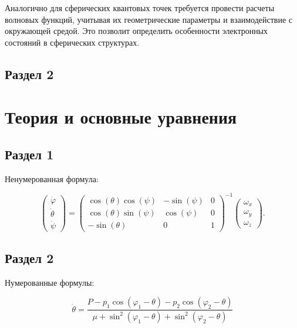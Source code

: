 \documentclass[a4paper,14pt]{extarticle}
\begin{document}
Аналогично для сферических квантовых точек требуется провести расчеты волновых функций, учитывая их геометрические параметры и взаимодействие с окружающей средой. Это позволит определить особенности электронных состояний в сферических структурах.

\subsection{Раздел 2}

\pagebreak
\section{Теория и основные уравнения}

\subsection{Раздел 1}

Ненумерованная формула:

\begin{equation}
    \begin{pmatrix} \dot{\varphi}\\ \dot{\theta} \\ \dot{\psi} \end{pmatrix}
    = \begin{pmatrix}
        \cos(\theta)\cos(\psi) & -\sin(\psi) & 0 \\
        \cos(\theta)\sin(\psi) & \cos(\psi)  & 0 \\
        -\sin(\theta)         & 0         &  1
    \end{pmatrix}^{-1}
    \begin{pmatrix} \omega_x\\ \omega_y \\ \omega_z \end{pmatrix}. \nonumber
\end{equation}


\subsection{Раздел 2}

Нумерованные формулы:

\begin{equation}
\label{eq:1}
    \dot{\theta}=\frac{P-p_{1}\cos\left(\varphi_{1}-\theta\right)-p_{2}\cos\left(\varphi_{2}-\theta\right)}{\mu+\sin^{2}\left(\varphi_{1}-\theta\right)+\sin^{2}\left(\varphi_{2}-\theta\right)}
\end{equation}
\end{document}
